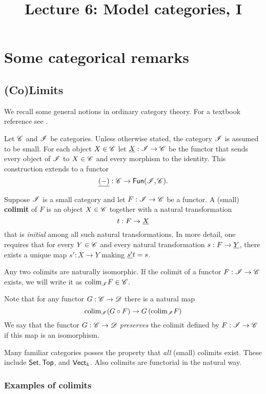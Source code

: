 \documentclass[11pt]{amsart}
\title{Lecture 6: Model categories, I}
\def\Fun{{\sf Fun}}
\def\colim{{\rm colim}}
\def\Set{{\sf Set}}
\def\Top{{\sf Top}}
\begin{document}
\maketitle

\section{Some categorical remarks}

\subsection{(Co)Limits}

We recall some general notions in ordinary category theory. 
For a textbook reference see \cite{MacLane}.

Let $\mathscr C$ and $\mathscr I$ be categories. 
Unless otherwise stated, the category $\mathscr I$ is assumed to be small.
For each object $X \in \mathscr C$ let $\underline{X} : \mathscr I \to \mathscr C$ be the functor that sends every object of $\mathscr I$ to $X \in \mathscr C$ and every morphism to the identity. 
This construction extends to a functor
\[
\ul{(-)} : \sC \to \Fun(\sI, \sC) .
\]

\begin{dfn}
Suppose $\mathscr I$ is a small category and let $F : \mathscr I \to \mathscr C$ be a functor. 
A (small) {\bf colimit} of $F$ is an object $X \in \mathscr C$ together with a natural transformation
\[
t : F \to \underline{X}
\]
that is {\em initial} among all such natural transformations. 
In more detail, one requires that for every $Y \in \mathscr C$ and every natural transformation $s : F \to \underline{Y}$, there exists a unique map $s' : X \to Y$ making $\underline{s'} t = s$. 
\end{dfn}

Any two colimits are naturally isomorphic. 
If the colimit of a functor $F : \mathscr I \to \mathscr C$ exists, we will write it as $\colim_{\sI} F \in \sC$. 

Note that for any functor $G : \mathscr C \to \mathscr D$ there is a natural map
\[
\colim_{\sI} (G \circ F) \to G \left(\colim_{\sI} F\right)
\]
We say that the functor $G : \mathscr C \to \mathscr D$ {\em preserves} the colimit defined by $F : \mathscr I \to \mathscr C$ if this map is an isomorphism.

Many familiar categories posses the property that {\em all} (small) colimits exist. 
These include $\Set, \Top$, and ${\sf Vect}_k$.
Also colimits are functorial in the natural way. 

\subsubsection{Examples of colimits}
\end{document}
